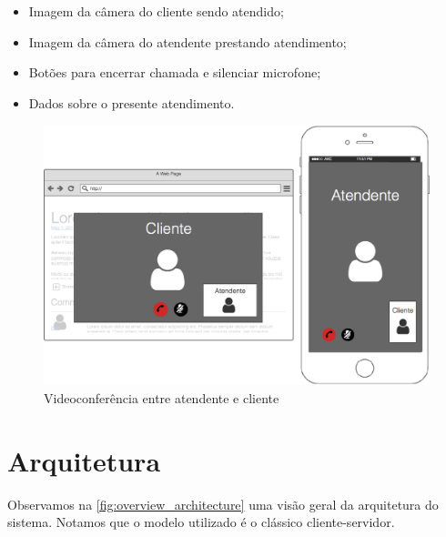 \begin{itemize}
 \item Imagem da câmera do cliente sendo atendido;
 \item Imagem da câmera do atendente prestando atendimento;
 \item Botões para encerrar chamada e silenciar microfone;
 \item Dados sobre o presente atendimento.
\end{itemize}

\begin{figure}[ht!]
	\centering
    \includegraphics[scale=0.2]{figures/prototypes/videoconference.png} 
	\caption{Videoconferência entre atendente e cliente}
	\label{fig:videoconference}
\end{figure}

\section{Arquitetura}

Observamos na \autoref{fig:overview_architecture} uma visão geral da arquitetura do sistema. Notamos que o modelo utilizado é o clássico cliente-servidor.

